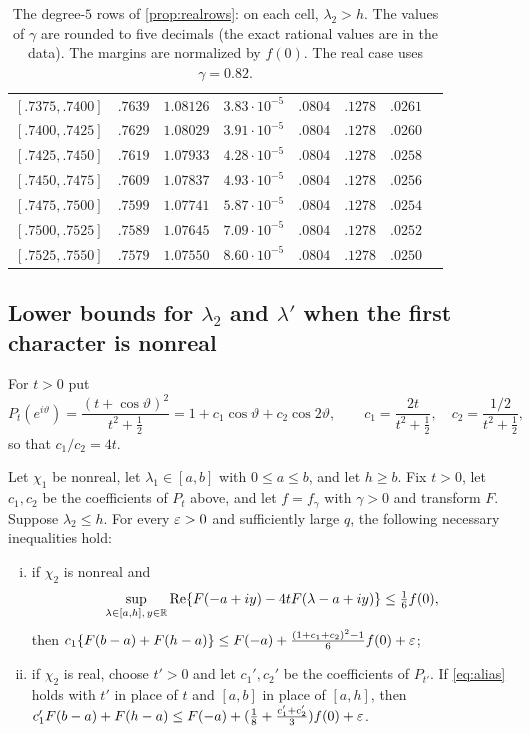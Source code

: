 \begin{table}[ht]
\begin{tabular}{@{}cccccccc@{}}
$[.7375,.7400]$ & $.7639$ & $1.08126$ & $3.83\cdot10^{-5}$ & $.0804$ & $.1278$ & $.0261$\\
$[.7400,.7425]$ & $.7629$ & $1.08029$ & $3.91\cdot10^{-5}$ & $.0804$ & $.1278$ & $.0260$\\
$[.7425,.7450]$ & $.7619$ & $1.07933$ & $4.28\cdot10^{-5}$ & $.0804$ & $.1278$ & $.0258$\\
$[.7450,.7475]$ & $.7609$ & $1.07837$ & $4.93\cdot10^{-5}$ & $.0804$ & $.1278$ & $.0256$\\
$[.7475,.7500]$ & $.7599$ & $1.07741$ & $5.87\cdot10^{-5}$ & $.0804$ & $.1278$ & $.0254$\\
$[.7500,.7525]$ & $.7589$ & $1.07645$ & $7.09\cdot10^{-5}$ & $.0804$ & $.1278$ & $.0252$\\
$[.7525,.7550]$ & $.7579$ & $1.07550$ & $8.60\cdot10^{-5}$ & $.0804$ & $.1278$ & $.0250$\\
\bottomrule
\end{tabular}
\caption{The degree-$5$ rows of \cref{prop:realrows}: on each cell, $\lambda_2>h$. The values of $\gamma$
are rounded to five decimals (the exact rational values are in the data). The margins are
normalized by $f(0)$. The real case uses $\gamma=0.82$.}
\label{tab:realrows}
\end{table}

\subsection{Lower bounds for \texorpdfstring{$\lambda_2$}{lambda2} and \texorpdfstring{$\lambda'$}{lambda'} when the first character is nonreal}
For $t>0$ put
\[
  P_t(e^{i\vartheta})=\frac{(t+\cos\vartheta)^2}{t^2+\frac12}=1+c_1\cos\vartheta+c_2\cos2\vartheta,\qquad
  c_1=\frac{2t}{t^2+\frac12},\quad c_2=\frac{1/2}{t^2+\frac12},
\]
so that $c_1/c_2=4t$.

\begin{proposition}\label{prop:complexrows}
Let $\chi_1$ be nonreal, let $\lambda_1\in[a,b]$ with $0\le a\le b$, and let $h\ge b$.
Fix $t>0$, let $c_1,c_2$ be the coefficients of $P_t$ above, and let
$f=f_\gamma$ with $\gamma>0$ and transform $F$.
Suppose $\lambda_2\le h$. For every $\varepsilon>0$ and sufficiently large $q$, the following
necessary inequalities hold:
\begin{enumerate}[(i)]
  \item if $\chi_2$ is nonreal and
    \begin{equation}\label{eq:alias}
      \sup_{\lambda\in[a,h],\,y\in\mathbb{R}}\operatorname{Re}\{F(-a+iy)-4tF(\lambda-a+iy)\}\le\tfrac16f(0),
    \end{equation}
    then $c_1\{F(b-a)+F(h-a)\}\le F(-a)+\frac{(1+c_1+c_2)^2-1}6f(0)+\varepsilon$;
  \item if $\chi_2$ is real, choose $t'>0$ and let $c_1',c_2'$ be the coefficients of $P_{t'}$.
    If \eqref{eq:alias} holds with $t'$ in place of $t$ and $[a,b]$ in place of
    $[a,h]$, then $c_1'F(b-a)+F(h-a)\le F(-a)+(\frac18+\frac{c_1'+c_2'}3)f(0)+\varepsilon$.
\end{enumerate}
\end{proposition}

